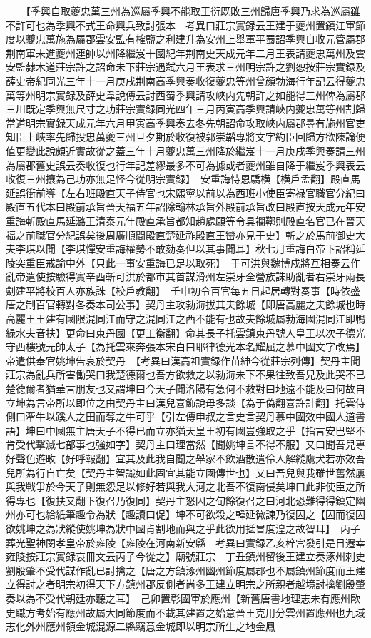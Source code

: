 　　【季興自取夔忠萬三州為巡屬季興不能取王衍既敗三州歸唐季興乃求為巡屬雖不許可也為季興不式王命興兵致討張本　考異曰莊宗實録云王建于夔州置鎮江軍節度以夔忠萬施為屬郡雲安監有榷鹽之利建升為安州上舉軍平蜀詔季興自收元管屬郡荆南軍未進夔州連帥以州降繼岌十國紀年荆南史天成元年二月王表請夔忠萬州及雲安監隸木道莊宗許之詔命未下莊宗遇弑六月王表求三州明宗許之劉恕按莊宗實録及薛史帝紀同光三年十一月庚戌荆南高季興奏收復夔忠等州曾顔勃海行年記云得夔忠萬等州明宗實録及薛史韋說傳云討西蜀季興請攻峽内先朝許之如能得三州俾為屬郡三川既定季興無尺寸之功莊宗實録同光四年三月丙寅高季興請峽内夔忠萬等州割歸當道明宗實録天成元年六月甲寅高季興奏去冬先朝詔命攻取峽内屬郡尋有施州官吏知臣上峽率先歸投忠萬夔三州旦夕期於收復被郭崇韜專將文字約臣回歸方欲陳論便值更變此說頗近實故從之蓋三年十月夔忠萬三州降於繼岌十一月庚戌季興奏請三州為屬郡舊史誤云奏收復也行年記差繆最多不可為據或者夔州雖自降于繼岌季興表云收復三州攘為己功亦無足怪今從明宗實録】　安重誨恃恩驕横【横戶孟翻】殿直馬延誤衝前導【左右班殿直天子侍官也宋熙寧以前以為西班小使臣寄禄官職官分紀曰殿直五代本曰殿前承旨晉天福五年詔除翰林承旨外殿前承旨改曰殿直按天成元年安重誨斬殿直馬延潞王清泰元年殿直承旨都知趙處願等令具襴鞹則殿直名官已在晉天福之前職官分紀誤矣後周廣順間殿直楚延祚殿直王巒亦見于史】斬之於馬前御史大夫李琪以聞【李琪憚安重誨權勢不敢劾奏但以其事聞耳】秋七月重誨白帝下詔稱延陵突重臣戒諭中外【只此一事安重誨已足以取死】　于可洪與魏博戍將互相奏云作亂帝遣使按驗得實辛酉斬可洪於都市其首謀滑州左崇牙全營族誅助亂者右崇牙兩長劍建平將校百人亦族誅【校戶教翻】　壬申初令百官每五日起居轉對奏事【時依盛唐之制百官轉對各奏本司公事】契丹主攻勃海拔其夫餘城【即唐高麗之夫餘城也時高麗王王建有國限混同江而守之混同江之西不能有也故夫餘城屬勃海國混同江即鴨緑水夫音扶】更命曰東丹國【更工衡翻】命其長子托雲鎮東丹號人皇王以次子德光守西樓號元帥太子【為托雲來奔張本宋白曰耶律德光本名耀屈之慕中國文字改焉】帝遣供奉官姚坤告哀於契丹　【考異曰漢高祖實録作苗紳今從莊宗列傳】契丹主聞莊宗為亂兵所害慟哭曰我楚德爾也吾方欲救之以勃海未下不果往致吾兒及此哭不已楚德爾者猶華言朋友也又謂坤曰今天子聞洛陽有急何不救對曰地遠不能及曰何故自立坤為言帝所以即位之由契丹主曰漢兒喜飾說毋多談【為于偽翻喜許計翻】托雲侍側曰牽牛以蹊人之田而奪之牛可乎【引左傳申叔之言史言契丹慕中國效中國人道書語】坤曰中國無主唐天子不得已而立亦猶天皇王初有國豈強取之乎【指言安巴堅不肯受代撃滅七部事也強如字】契丹主曰理當然【聞姚坤言不得不服】又曰聞吾兒專好聲色遊畋【好呼報翻】宜其及此我自聞之舉家不飲酒散遣伶人解縱鷹犬若亦效吾兒所為行自亡矣【契丹主智識如此固宜其能立國傳世也】又曰吾兒與我雖世舊然屢與我戰爭於今天子則無怨足以修好若與我大河之北吾不復南侵矣坤曰此非使臣之所得專也【復扶又翻下復召乃復同】契丹主怒囚之旬餘復召之曰河北恐難得得鎮定幽州亦可也給紙筆趣令為狀【趣讀曰促】坤不可欲殺之韓延徽諫乃復囚之【囚而復囚欲姚坤之為狀縱使姚坤為狀中國肯割地而與之乎此欲用抵冒度湟之故智耳】　丙子葬光聖神閔孝皇帝於雍陵【雍陵在河南新安縣　考異曰實録乙亥梓宫發引是日遷幸雍陵按莊宗實録哀冊文云丙子今從之】廟號莊宗　丁丑鎮州留後王建立奏涿州刺史劉殷肇不受代謀作亂已討擒之【唐之方鎮涿州幽州節度屬郡也不屬鎮州節度而王建立得討之者明宗初得天下方鎮州郡反側者尚多王建立明宗之所親者越境討擒劉殷肇奏以為不受代朝廷亦聽之耳】　己卯置彰國軍於應州【新舊唐書地理志未有應州歐史職方考始有應州故屬大同節度而不載其建置之始意晉王克用分雲州置應州也九域志化外州應州領金城混源二縣竊意金城即以明宗所生之地金鳳